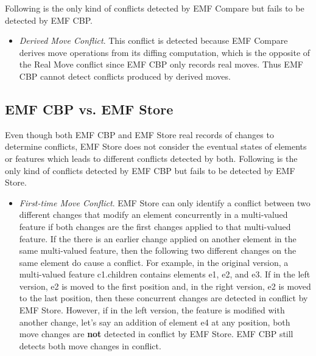 Following is the only kind of conflicts detected by EMF Compare but fails to be detected by EMF CBP. 
\begin{itemize}
  \item \emph{Derived Move Conflict}. This conflict is detected because EMF Compare derives move operations from its diffing computation, which is the opposite of the Real Move conflict since EMF CBP only records real moves. Thus EMF CBP cannot detect conflicts produced by derived moves.
\end{itemize}

\subsection{EMF CBP vs. EMF Store}
\label{sec:emf_cbp_vs_emf_store}
Even though both EMF CBP and EMF Store real records of changes to determine conflicts, EMF Store does not consider the eventual states of elements or features which leads to different conflicts detected by both. Following is the only kind of conflicts detected by EMF CBP but fails to be detected by EMF Store. 
\begin{itemize}
  \item \emph{First-time Move Conflict}. EMF Store can only identify a conflict between two different changes that modify an element concurrently in a multi-valued feature if both changes are the first changes applied to that multi-valued feature. If the there is an earlier change applied on another element in the same multi-valued feature, then the following two different changes on the same element do cause a conflict. For example, in the original version, a multi-valued feature \textsf{c1}.\textsf{children} contains elements \textsf{e1}, \textsf{e2}, and \textsf{e3}. If in the left version, \textsf{e2} is moved to the first position and, in the right version, \textsf{e2} is moved to the last position, then these concurrent changes are detected in conflict by EMF Store. However, if in the left version, the feature is modified with another change, let's say an addition of element \textsf{e4} at any position, both \textsf{move} changes are \textbf{not} detected in conflict by EMF Store. EMF CBP still detects both \textsf{move} changes in conflict.
\end{itemize}

